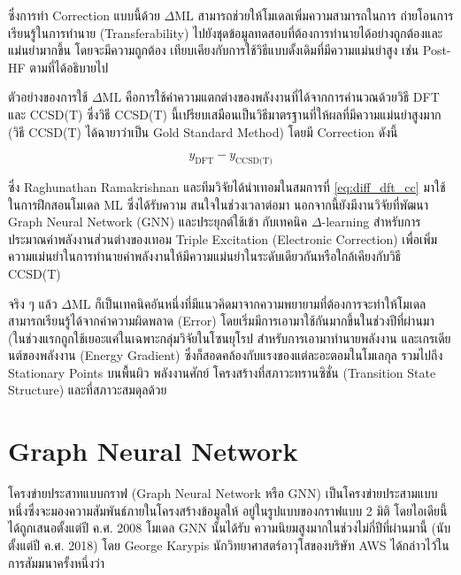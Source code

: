 ซึ่งการทำ Correction แบบนี้ด้วย $\Delta\text{ML}$ สามารถช่วยให้โมเดลเพิ่มความสามารถในการ%
ถ่ายโอนการเรียนรู้ในการทำนาย (Transferability) ไปยังชุดข้อมูลทดสอบที่ต้องการทำนายได้อย่างถูกต้องและแม่นยำมากขึ้น โดยจะมีความถูกต้อง%
เทียบเคียงกับการใช้วิธีแบบดั้งเดิมที่มีความแม่นยำสูง เช่น Post-HF ตามที่ได้อธิบายไป 

ตัวอย่างของการใช้ $\Delta\text{ML}$ คือการใช้ค่าความแตกต่างของพลังงานที่ได้จากการคำนวณด้วยวิธี DFT และ CCSD(T) ซึ่งวิธี CCSD(T) 
นี้เปรียบเสมือนเป็นวิธีมาตรฐานที่ให้ผลที่มีความแม่นยำสูงมาก (วิธี CCSD(T) ได้ฉายาว่าเป็น Gold Standard Method) โดยมี Correction ดังนี้

\begin{equation}\label{eq:diff_dft_cc}
    y_{\text{DFT}} - y_{\text{CCSD(T)}}
\end{equation}

ซึ่ง Raghunathan Ramakrishnan และทีมวิจัยได้นำเทอมในสมการที่ \ref{eq:diff_dft_cc} มาใช้ในการฝึกสอนโมเดล ML ซึ่งได้รับความ%
สนใจในช่วงเวลาต่อมา\autocite{ramakrishnan2015a} นอกจากนี้ยังมีงานวิจัยที่พัฒนา Graph Neural Network (GNN) และประยุกต์ใช้เข้า%
กับเทคนิค $\Delta$-learning สำหรับการประมาณค่าพลังงานส่วนต่างของเทอม Triple Excitation (Electronic Correction) 
เพื่อเพิ่มความแม่นยำในการทำนายค่าพลังงานให้มีความแม่นยำในระดับเดียวกันหรือใกล้เคียงกับวิธี CCSD(T)\autocite{ruth2022}

จริง ๆ แล้ว $\Delta\text{ML}$ ก็เป็นเทคนิคอันหนึ่งที่มีแนวคิดมาจากความพยายามที่ต้องการจะทำให้โมเดลสามารถเรียนรู้ได้จากค่าความผิดพลาด 
(Error) โดยเริ่มมีการเอามาใช้กันมากขึ้นในช่วงปีที่ผ่านมา (ในช่วงแรกถูกใช้เยอะแค่ในเฉพาะกลุ่มวิจัยในโซนยุโรป สำหรับการเอามาทำนายพลังงาน%
และเกรเดียนต์ของพลังงาน (Energy Gradient) ซึ่งก็สอดคล้องกับแรงของแต่ละอะตอมในโมเลกุล รวมไปถึง Stationary Points บนพื้นผิว%
พลังงานศักย์ โครงสร้างที่สภาวะทรานซิชั่น (Transition State Structure) และที่สภาวะสมดุลด้วย

\section{Graph Neural Network}
\label{sec:gnn}

โครงข่ายประสาทแบบกราฟ (Graph Neural Network หรือ GNN) เป็นโครงข่ายประสามแบบหนึ่งซึ่งจะมองความสัมพันธ์ภายในโครงสร้างข้อมูลให้%
อยู่ในรูปแบบของกราฟแบบ 2 มิติ โดยไอเดียนี้ได้ถูกเสนอตั้งแต่ปี ค.ศ. 2008\autocite{scarselli2009,zhou2020} โมเดล GNN นั้นได้รับ%
ความนิยมสูงมากในช่วงไม่กี่ปีที่ผ่านมานี้ (นับตั้งแต่ปี ค.ศ. 2018) โดย George Karypis นักวิทยาศาสตร์อาวุโสของบริษัท AWS ได้กล่าวไว้ใน%
การสัมมนาครั้งหนึ่งว่า 

